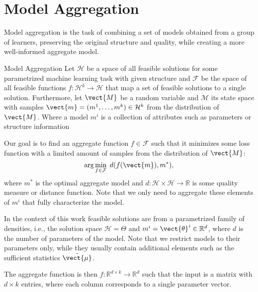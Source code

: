 
\chapter{Model Aggregation}
\label{chapter:ch3}
Model aggregation is the task of combining a set of models obtained from a group of learners, preserving the original structure and quality, while creating a more well-informed aggregate model.
\begin{definition}[parbox=false]{Model Aggregation}
    Let $\mathcal{H}$ be a space of all feasible solutions for some parametrized machine learning task with given structure and $\mathcal{F}$ be the space of all feasible functions $f: \mathcal{H}^k \rightarrow \mathcal{H}$ that map a set of feasible solutions to a single solution.
    Furthermore, let $\vect{M}$ be a random variable and $\mathcal{M}$ its state space with samples  $\vect{m} = (m^1, \ldots, m^k) \in \mathcal{H}^k$ from the distribution of $\vect{M}$.
    Where a model $m^i$ is a collection of attributes such as parameters or structure information

    Our goal is to find an aggregate function $f \in \mathcal{F}$ such that it minimizes some loss function with a limited amount of samples from the distribution of $\vect{M}$:
    \begin{equation}
        \label{eq:regret}
        \arg\min_{f \in \mathcal{F}} \; d(f(\vect{m}), m^*),
    \end{equation}
    where $m^*$ is the optimal aggregate model and $d: \mathcal{H} \times \mathcal{H} \rightarrow \mathbb{R}$ is some quality measure or distance function.
    Note that we only need to aggregate these elements of $m^i$ that fully characterize the model.
\end{definition}

In the context of this work feasible solutions are from a parametrized family of densities, i.e., the solution space $\mathcal{H} = \Theta$ and  $m^i = \vect{\theta}^i \in \mathbb{R}^d$, where $d$ is the number of parameters of the model. 
Note that we restrict models to their parameters only, while they usually contain additional elements such as the sufficient statistics $\tilde{\vect{\mu}}$.

The aggregate function is then $f: \mathbb{R}^{d \times k} \rightarrow \mathbb{R}^{d}$ such that the input is a matrix with \\ $d \times k$ entries, where each column corresponds to a single parameter vector.

